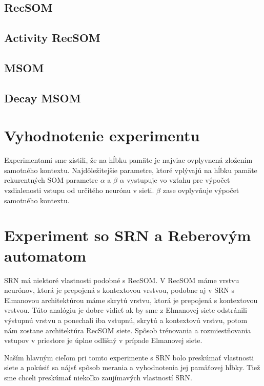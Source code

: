 \subsection{RecSOM}

\subsection{Activity RecSOM}
\subsection{MSOM}

\subsection{Decay MSOM}



\section{ Vyhodnotenie experimentu }
Experimentami sme zistili, že na hĺbku pamäte je najviac ovplyvnená zložením samotného kontextu.
Najdôležitejšie parametre, ktoré vplývajú na hĺbku pamäte rekurentných SOM parametre $\alpha$ a $\beta$
$\alpha$ vystupuje vo vzťahu pre výpočet vzdialenosti vstupu od určitého neurónu v sieti.
$\beta$ zase ovplyvňuje výpočet samotného kontextu.



\section{Experiment so SRN a Reberovým automatom}
SRN má niektoré vlastnosti podobné s RecSOM.
V RecSOM máme vrstvu neurónov, ktorá je prepojená s kontextovou vrstvou, podobne 
aj v SRN s Elmanovou architektúrou máme skrytú vrstvu, ktorá je prepojená s kontextovou vrstvou.
Túto analógiu je dobre vidieť ak by sme z Elmanovej siete odstránili výstupnú vrstvu a ponechali iba 
vstupnú, skrytú a kontextovú vrstvu, potom nám zostane architektúra RecSOM siete.
Spôsob trénovania a rozmiestňovania vstupov v priestore je úplne odlišný v prípade Elmanovej siete.

Naším hlavným cieľom pri tomto experimente s SRN bolo preskúmať vlastnosti siete a pokúsiť sa nájsť 
spôsob merania a vyhodnotenia jej pamäťovej hĺbky. 
Tiež sme chceli preskúmať niekoľko zaujímavých vlastností SRN.

